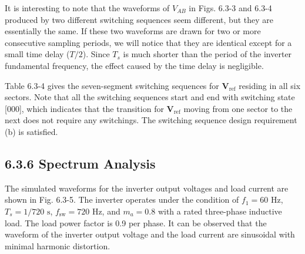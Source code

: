 \documentclass[letterpaper,12pt]{article}
\begin{document}
It is interesting to note that the waveforms of \( V_{AB} \) in Figs. 6.3-3 and 6.3-4 produced by two different switching sequences seem different, but they are essentially the same. If these two waveforms are drawn for two or more consecutive sampling periods, we will notice that they are identical except for a small time delay (\( T/2 \)). Since \( T_s \) is much shorter than the period of the inverter fundamental frequency, the effect caused by the time delay is negligible.

Table 6.3-4 gives the seven-segment switching sequences for \( \mathbf{V}_{\text{ref}} \) residing in all six sectors. Note that all the switching sequences start and end with switching state [000], which indicates that the transition for \( \mathbf{V}_{\text{ref}} \) moving from one sector to the next does not require any switchings. The switching sequence design requirement (b) is satisfied.

\subsection*{6.3.6 Spectrum Analysis}

The simulated waveforms for the inverter output voltages and load current are shown in Fig. 6.3-5. The inverter operates under the condition of \( f_1 = 60 \text{ Hz} \), \( T_s = 1/720 \text{ s} \), \( f_{\text{sw}} = 720 \text{ Hz} \), and \( m_a = 0.8 \) with a rated three-phase inductive load. The load power factor is 0.9 per phase. It can be observed that the waveform of the inverter output voltage and the load current are sinusoidal with minimal harmonic distortion.
\end{document}
